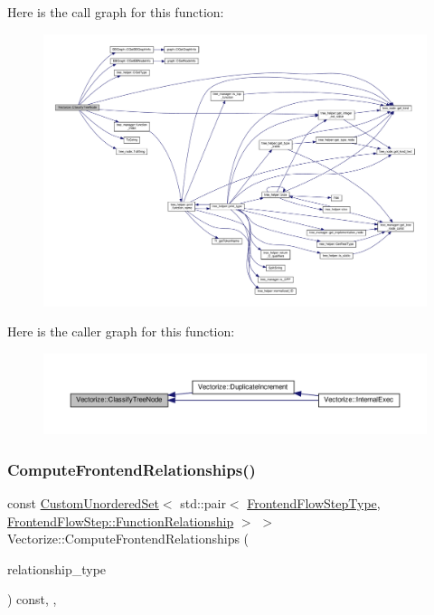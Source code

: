 Here is the call graph for this function\+:
\nopagebreak
\begin{figure}[H]
\begin{center}
\leavevmode
\includegraphics[width=350pt]{d5/da5/classVectorize_acc3c1a7baaaf386b05c44ec4c8d6f3ce_cgraph}
\end{center}
\end{figure}
Here is the caller graph for this function\+:
\nopagebreak
\begin{figure}[H]
\begin{center}
\leavevmode
\includegraphics[width=350pt]{d5/da5/classVectorize_acc3c1a7baaaf386b05c44ec4c8d6f3ce_icgraph}
\end{center}
\end{figure}
\mbox{\label{classVectorize_a949af411d288a13db50925106f15054c}} 
\subsubsection{\texorpdfstring{Compute\+Frontend\+Relationships()}{ComputeFrontendRelationships()}}
{\footnotesize\ttfamily const \hyperlink{classCustomUnorderedSet}{Custom\+Unordered\+Set}$<$ std\+::pair$<$ \hyperlink{frontend__flow__step_8hpp_afeb3716c693d2b2e4ed3e6d04c3b63bb}{Frontend\+Flow\+Step\+Type}, \hyperlink{classFrontendFlowStep_af7cf30f2023e5b99e637dc2058289ab0}{Frontend\+Flow\+Step\+::\+Function\+Relationship} $>$ $>$ Vectorize\+::\+Compute\+Frontend\+Relationships (\begin{DoxyParamCaption}\item[{const \hyperlink{classDesignFlowStep_a723a3baf19ff2ceb77bc13e099d0b1b7}{Design\+Flow\+Step\+::\+Relationship\+Type}}]{relationship\+\_\+type }\end{DoxyParamCaption}) const\hspace{0.3cm}{\ttfamily [override]}, {\ttfamily [private]}, {\ttfamily [virtual]}}



